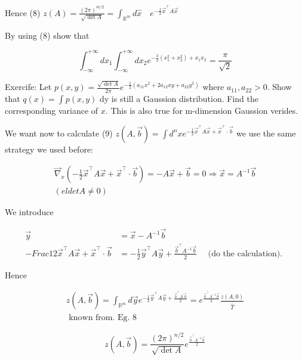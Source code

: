 Hence
(8) \quad $z(A)=\frac{(2 \pi)^{m / 2}}{\sqrt{\operatorname{det} A}}=\int_{\mathbb{R}^{m}} d \hat{x} \quad e^{-\frac{1}{2} \vec{x}^{\top} A \vec{x}}$

By using (8) show that

$$ 
\int_{-\infty}^{+\infty} d x_{1} \int_{-\infty}^{+\infty} d x_{2} e^{-\frac{3}{2}\left(x_{1}^{2}+x_{2}^{2}\right)+x_{1} x_{2}}=\frac{\pi}{\sqrt{2}} 
$$ 

Exercife: Let $p(x, y)=\frac{\sqrt{\operatorname{det} A}}{2 \pi} e^{-\frac{1}{2}\left(a_{11} x^{2}+2 a_{12} x y+a_{22} y^{2}\right)}$ where $a_{11}, a_{22}>0$. Show that $q(x)=\int p(x, y)$ dy is still a Gaussion distribution. Find the corresponding variance of $x$. This is also true for m-dimension Gaussion verides.

We want now to calculate
(9) $z(A, \vec{b})=\int d^{n} x e^{-\frac{1}{2} \vec{x}^{\top} A \vec{x}+\vec{x}^{\top} \cdot \vec{b}}$
we use the same strategy we used before:

$$ 
\begin{array}{r}
\vec{\nabla}_{x}\left(-\frac{1}{2} \vec{x}^{\top} A \vec{x}+\vec{x}^{\top} \cdot \vec{b}\right)=-A \vec{x}+\vec{b}=0 \Rightarrow \vec{x}=A^{-1} \vec{b} \\ (eldet A \neq 0)
\end{array}
$$ 

We introduce

$$ 
\begin{aligned}
\vec{y} & =\vec{x}-A^{-1} \vec{b} \\ -F rac{1}{2} \vec{x}^{\top} A \vec{x}+\vec{x}^{\top} \cdot \vec{b} & =-\frac{1}{2} \vec{y}^{\top} A \vec{y}+\frac{\vec{b}^{\top} A^{-1} \vec{b}}{2} \quad \text { (do the calculation). } 
\end{aligned}
$$ 

Hence

$$ 
\begin{array}{r}
z(A, \vec{b})=\int_{\mathbb{R}^{m}} d \vec{y} e^{-\frac{1}{2} \vec{y}^{\top} A \vec{y}+\frac{\vec{b}^{\top} A^{\prime} \vec{b}}{2}}=e^{\frac{\vec{b}^{\top} A^{-1} \vec{b}}{2}} \frac{z(A, 0)}{\overline{\widehat{T}}} \\ \text { known from. Eg. 8 }
\end{array}
$$ 


\begin{equation*}
z(A, \vec{b})=\frac{(2 \pi)^{n / 2}}{\sqrt{\operatorname{det} A}} e^{\frac{\vec{b}^{\top} A^{-1} \vec{b}}{2}} \tag{10}
\end{equation*} 


